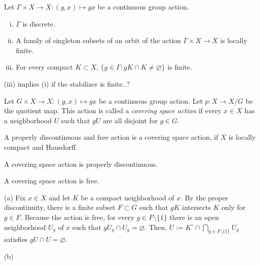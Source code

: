 \documentclass[a4paper]{article}
\begin{document}
\begin{prb}
Let $\Gamma\times X\to X:(g,x)\mapsto gx$ be a continuous group action.
\begin{enumerate}[(i)]
\item $\Gamma$ is discrete.
\item A family of singleton subsets of an orbit of the action $\Gamma\times X\to X$ is locally finite.
\item For every compact $K\subset X$, $\{g\in\Gamma:gK\cap K\ne\varnothing\}$ is finite.
\end{enumerate}
\begin{parts}
\item
\item (iii) implies (i) if the stabilizer is finite..?
\end{parts}
\end{prb}
\begin{pf}

\end{pf}




\begin{prb}
Let $G\times X\to X:(g,x)\mapsto gx$ be a continuous group action.
Let $p:X\to X/G$ be the quotient map.
This action is called a \emph{covering space action} if every $x\in X$ has a neighborhood $U$ such that $gU$ are all disjoint for $g\in G$.
\begin{parts}
\item A properly discontinuous and free action is a covering space action, if $X$ is locally compact and Hausdorff.
\item A covering space action is properly discontinuous.
\item A covering space action is free.
\end{parts}
\end{prb}
\begin{pf}
(a)
Fix $x\in X$ and let $K$ be a compact neighborhood of $x$.
By the proper discontinuity, there is a finite subset $F\subset G$ such that $gK$ intersects $K$ only for $g\in F$.
Because the action is free, for every $g\in F\setminus\{1\}$ there is an open neighborhood $U_g$ of $x$ such that $gU_g\cap U_g=\varnothing$.
Then, $U:=K^\circ\cap\bigcap_{g\in F\setminus\{1\}}U_g$ satisfies $gU\cap U=\varnothing$.

(b)

\end{pf}
\end{document}
